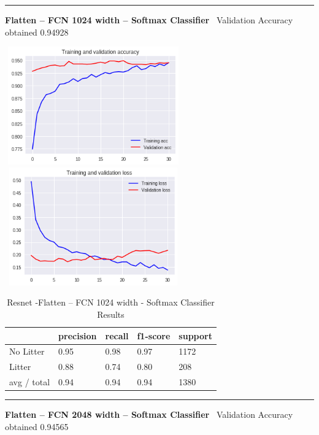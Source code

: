 \documentclass{IEEEtran}
\begin{document}
\begin{center}\noindent\rule{8cm}{0.4pt}\end{center}

\textbf{Flatten -- FCN 1024 width -- Softmax Classifier} \ 
Validation Accuracy obtained 0.94928

\includegraphics[width=3in,height=2in]{resnet-img/resnet-img003.png} 
\includegraphics[width=3in,height=2in]{resnet-img/resnet-img004.png} 


\bigskip

\begin{table}[ht]
\centering
\caption{Resnet -Flatten -- FCN 1024 width - Softmax Classifier Results}
\begin{tabular}{|l|l|l|l|l|} 
\hline
 & precision & recall  & f1-score  & support \\\hline
No Litter  &
0.95  &
0.98  &
0.97  &
1172 \\\hline
Litter  &
0.88  &
0.74  &
0.80  &
208 \\\hline
avg / total  &
0.94  &
0.94 &
0.94 &
1380\\\hline
\end{tabular}
\end{table}

\begin{center}\noindent\rule{8cm}{0.4pt}\end{center}


\bigskip

\textbf{Flatten -- FCN 2048 width -- Softmax Classifier }\ 
Validation Accuracy obtained 0.94565
\end{document}
